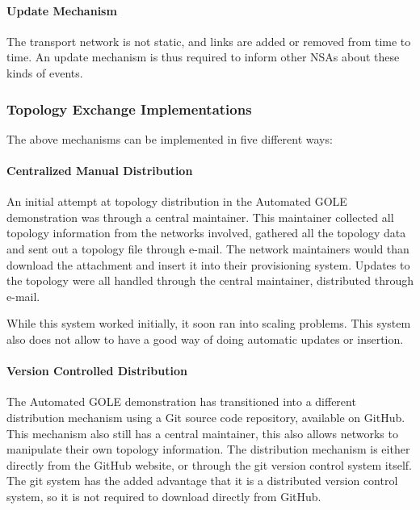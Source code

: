 \documentclass{article}
\begin{document}
\paragraph{Update Mechanism}

 The transport network is not static, and links are added or removed 
from time to time. An update mechanism is thus required to inform other NSAs about 
these kinds of events.\label{h.uzmy62lgeii3}


\subsubsection{Topology Exchange Implementations}

 The above mechanisms can be implemented in five different ways:


\paragraph{Centralized Manual Distribution}
 An initial attempt at topology distribution in the Automated GOLE 
demonstration was through a central maintainer. This maintainer collected all topology 
information from the networks involved, gathered all the topology data and sent 
out a topology file through e-mail. The network maintainers would than download 
the attachment and insert it into their provisioning system. Updates to the topology 
were all handled through the central maintainer, distributed through e-mail.\label{h.31tbtceozcoc}


While this system worked initially, it soon ran into 
scaling problems. This system also does not allow to have a good way of doing automatic 
updates or insertion.


\paragraph{Version Controlled Distribution}

 The Automated GOLE demonstration has transitioned into a different 
distribution mechanism using a Git source code repository, available on GitHub. 
This mechanism also still has a central maintainer, this also allows networks to 
manipulate their own topology information. The distribution mechanism is either 
directly from the GitHub website, or through the git version control system itself. 
The git system has the added advantage that it is a distributed version control 
system, so it is not required to download directly from GitHub.\label{h.rtljwvhj8cbo}
\end{document}
